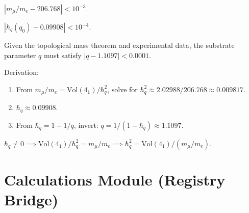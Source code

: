 \begin{lemma}
  \label{lem:mu-e-approx}
  $|m_\mu/m_e - 206.768| < 10^{-3}$.
\end{lemma}

\begin{lemma}
  \label{lem:hq-approx}
  $|\hbar_q(q_0) - 0.09908| < 10^{-4}$.
\end{lemma}

\begin{theorem}
  \label{thm:derive-substrate-q}
  Given the topological mass theorem and experimental data,
  the substrate parameter $q$ must satisfy $|q - 1.1097| < 0.0001$.

  Derivation:
  \begin{enumerate}
    \item From $m_\mu/m_e = \mathrm{Vol}(4_1)/\hbar_q^2$, solve for
          $\hbar_q^2 \approx 2.02988/206.768 \approx 0.009817$.
    \item $\hbar_q \approx 0.09908$.
    \item From $\hbar_q = 1 - 1/q$, invert: $q = 1/(1-\hbar_q) \approx 1.1097$.
  \end{enumerate}
\end{theorem}

\begin{lemma}
  \label{lem:mass-ratio-from-volume}
  $\hbar_q \neq 0 \implies \mathrm{Vol}(4_1)/\hbar_q^2 = m_\mu/m_e
  \implies \hbar_q^2 = \mathrm{Vol}(4_1)/(m_\mu/m_e)$.
\end{lemma}


\chapter{Calculations Module (Registry Bridge)}

